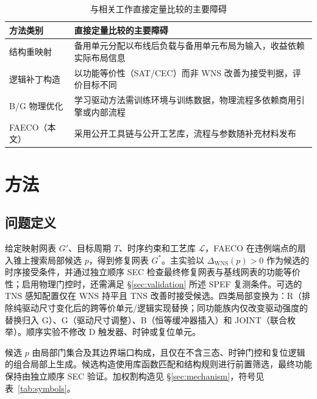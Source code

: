 \documentclass[twocolumn,10pt,fontset=windows]{ctexart}
\begin{document}
\begin{table}[ht]
\centering
\caption{与相关工作直接定量比较的主要障碍}
\label{tab:baseline_cmp}
\footnotesize
\setlength{\tabcolsep}{3pt}
\begin{tabular}{>{\raggedright\arraybackslash}p{2.3cm}>{\raggedright\arraybackslash}p{5.0cm}}
\toprule
\textbf{方法类别} & \textbf{直接定量比较的主要障碍} \\
\midrule
结构重映射 & 备用单元分配以布线后负载与备用单元布局为输入，收益依赖实际布局信息 \\
逻辑补丁构造 & 以功能等价性（SAT/CEC）而非 WNS 改善为接受判据，评价目标不同 \\
B/G 物理优化 & 学习驱动方法需训练环境与训练数据，物理流程多依赖商用引擎或内部流程 \\
FAECO（本文） & 采用公开工具链与公开工艺库，流程与参数随补充材料发布 \\
\bottomrule
\end{tabular}
\end{table}


\section{方法}

\subsection{问题定义}
给定映射网表 $G'$、目标周期 $T$、时序约束和工艺库 $\mathcal{L}$，FAECO 在违例端点的扇入锥上搜索局部候选 $p$，得到修复网表 $G^*$。主实验以 $\Delta_{\mathrm{WNS}}(p)>0$ 作为候选的时序接受条件，并通过独立顺序 SEC 检查最终修复网表与基线网表的功能等价性；启用物理门控时，还需满足 \S\ref{sec:validation} 所述 SPEF 复测条件。可选的 TNS 感知配置仅在 WNS 持平且 TNS 改善时接受候选。四类局部变换为：R（排除纯驱动尺寸变化后的跨等价单元/逻辑实现替换；同功能族内仅改变驱动强度的替换归入 G）、G（驱动尺寸调整）、B（恒等缓冲器插入）和 JOINT（联合枚举）。顺序实验不修改 D 触发器、时钟或复位单元。

候选 $p$ 由局部门集合及其边界端口构成，且仅在不含三态、时钟门控和复位逻辑的组合局部上生成。候选构造使用库函数匹配和结构规则进行前置筛选，最终功能保持由独立顺序 SEC 验证。加权割构造见 \S\ref{sec:mechanism}，符号见表~\ref{tab:symbols}。
\end{document}
